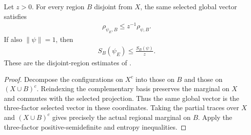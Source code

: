 \begin{theorem}
\label{thm:entropy_regional_typical_state_bound}
\leanok
{}
Let $z>0$. For every region $B$ disjoint from $X$, the same selected global
vector satisfies
\begin{align}
 \rho_{\psi_E,B}\le z^{-1}\rho_{\psi,B}.
\end{align}
If also $\|\psi\|=1$, then
\begin{align}
 S_B(\psi_E)\le \frac{S_B(\psi)}{z}.
\end{align}
These are the disjoint-region estimates of
\cite[Section~8]{OpenAI2026AreaLaw}.
\end{theorem}
\begin{proof}
\leanok
Decompose the configurations on $X^c$ into those on $B$ and those on
$(X\cup B)^c$. Reindexing the complementary basis preserves the marginal on $X$
and commutes with the selected projection. Thus the same global vector is the
three-factor selected vector in these coordinates. Taking the partial traces
over $X$ and $(X\cup B)^c$ gives precisely the actual regional marginal on $B$.
Apply the three-factor positive-semidefinite and entropy inequalities.
\end{proof}
